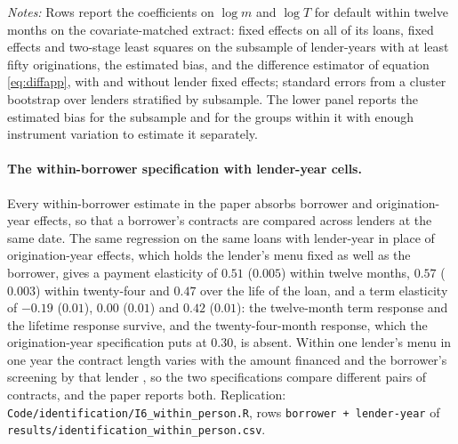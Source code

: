 \begin{table}[ht]
\centering
\caption{The payment margin: fixed effects, instruments, and the corrected estimate on the large-lender subsample}
\label{tab:identification}
\resizebox{\textwidth}{!}{}
\vspace{0.5em}
\begin{minipage}{0.95\textwidth}
\small \textit{Notes:} Rows report the coefficients on $\log m$ and $\log T$ for default within twelve months on the covariate-matched extract: fixed effects on all of its loans, fixed effects and two-stage least squares on the subsample of lender-years with at least fifty originations, the estimated bias, and the difference estimator of equation \eqref{eq:diffapp}, with and without lender fixed effects; standard errors from a cluster bootstrap over lenders stratified by subsample. The lower panel reports the estimated bias for the subsample and for the groups within it with enough instrument variation to estimate it separately.
\end{minipage}
\end{table}

\paragraph{The within-borrower specification with lender-year cells.} Every within-borrower estimate in the paper absorbs borrower and origination-year effects, so that a borrower's contracts are compared across lenders at the same date. The same regression on the same loans with lender-year in place of origination-year effects, which holds the lender's menu fixed as well as the borrower, gives a payment elasticity of $0.51$ ($0.005$) within twelve months, $0.57$ ($0.003$) within twenty-four and $0.47$ over the life of the loan, and a term elasticity of $-0.19$ ($0.01$), $0.00$ ($0.01$) and $0.42$ ($0.01$): the twelve-month term response and the lifetime response survive, and the twenty-four-month response, which the origination-year specification puts at $0.30$, is absent. Within one lender's menu in one year the contract length varies with the amount financed and the borrower's screening by that lender \citep{hertzberg_screening_2018}, so the two specifications compare different pairs of contracts, and the paper reports both. Replication: \texttt{Code/identification/I6\_within\_person.R}, rows \texttt{borrower + lender-year} of \texttt{results/identification\_within\_person.csv}.

